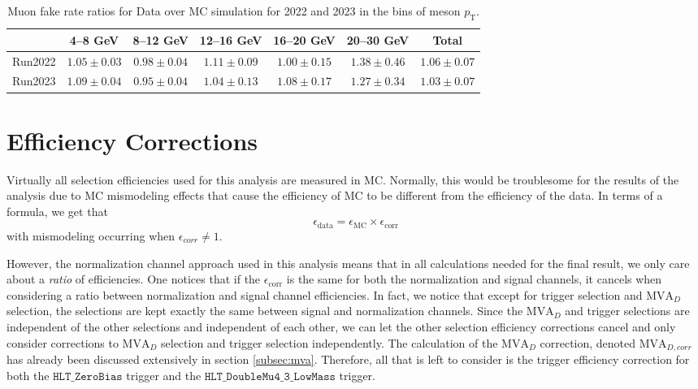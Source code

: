 \begin{table}[htbp]
    \centering
    \begin{tabular}{|c|c|c|c|c|c|c|}
    \hline
     & \textbf{4--8 GeV} & \textbf{8--12 GeV} & \textbf{12--16 GeV} & \textbf{16--20 GeV} & \textbf{20--30 GeV} & \textbf{Total} \\
    \hline
    Run2022 & $1.05 \pm 0.03$ & $0.98 \pm 0.04$ & $1.11 \pm 0.09$ & $1.00 \pm 0.15$ & $1.38 \pm 0.46$ & $1.06 \pm 0.07$ \\
    Run2023 & $1.09 \pm 0.04$ & $0.95 \pm 0.04$ & $1.04 \pm 0.13$ & $1.08 \pm 0.17$ & $1.27 \pm 0.34$ & $1.03 \pm 0.07$ \\
    \hline
    \end{tabular}
    \caption{Muon fake rate ratios for Data over MC simulation for 2022 and 2023 in the bins of meson $p_\mathrm{T}$.}
    \label{tab:muon_fake_rate}
\end{table}


\section{Efficiency Corrections}
\label{sec:efficiency_corrections}


Virtually all selection efficiencies used for this analysis are measured in MC. Normally, this would be troublesome for the results of the analysis due to MC mismodeling effects that cause the efficiency of MC to be different from the efficiency of the data. In terms of a formula, we get that 
\begin{equation}
    \epsilon_{\text{data}} = \epsilon_{\text{MC}} \times \epsilon_{\text{corr}}
\end{equation}
with mismodeling occurring when $\epsilon_{corr} \neq 1$. 

However, the normalization channel approach used in this analysis means that in all calculations needed for the final result, we only care about a \textit{ratio} of efficiencies. One notices that if the $\epsilon_{\text{corr}}$ is the same for both the normalization and signal channels, it cancels when considering a ratio between normalization and signal channel efficiencies. In fact, we notice that except for trigger selection and $\text{MVA}_D$ selection, the selections are kept exactly the same between signal and normalization channels. Since the $\text{MVA}_D$ and trigger selections are independent of the other selections and independent of each other, we can let the other selection efficiency corrections cancel and only consider corrections to $\text{MVA}_D$ selection and trigger selection independently. The calculation of the $\text{MVA}_D$ correction, denoted $\text{MVA}_{D,corr}$ has already been discussed extensively in section \ref{subsec:mva}. Therefore, all that is left to consider is the trigger efficiency correction for both the $\texttt{HLT\_ZeroBias}$ trigger and the $\texttt{HLT\_DoubleMu4\_3\_LowMass}$ trigger. 

